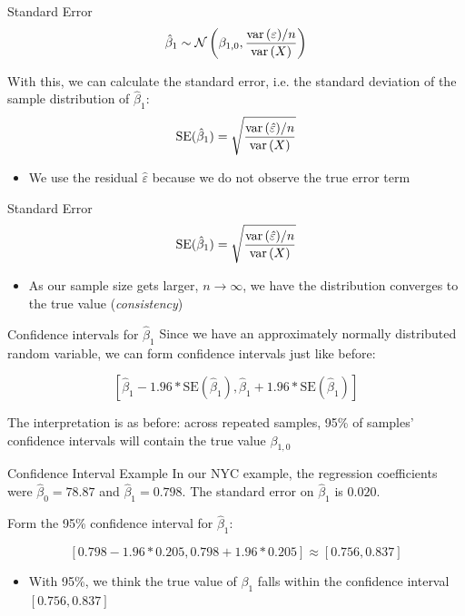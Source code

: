 \documentclass[aspectratio=169,t,11pt,table]{beamer}
\begin{document}
\begin{frame}{Standard Error}
  $$
    \hat{\beta}_1 \sim 
    \mathcal{N}\left( 
      \beta_{1, 0}, \frac{ \var{\varepsilon} / n }{\var{X}} 
    \right)
  $$

  \bigskip
  With this, we can calculate the \alert{standard error}, i.e. the standard deviation of the sample distribution of $\hat{\beta}_1$:
  $$
    \text{SE}(\hat{\beta}_1) = \sqrt{ \frac{ \var{\hat{\varepsilon}} / n }{\var{X}} }
  $$
  \begin{itemize}
    \item We use the residual $\hat{\varepsilon}$ because we do not observe the true error term
  \end{itemize}
\end{frame}

\begin{frame}{Standard Error}
  $$
    \text{SE}(\hat{\beta}_1) = \sqrt{ \frac{ \var{\hat{\varepsilon}} / n }{\var{X}} }
  $$

  \begin{itemize}
    \item As our sample size gets larger, $n \to \infty$, we have the distribution converges to the true value (\emph{consistency})
  \end{itemize}
\end{frame}


\begin{frame}{Confidence intervals for $\hat{\beta}_1$}
  Since we have an approximately normally distributed random variable, we can form confidence intervals just like before:

  $$
    \left[
      \hat{\beta}_1 - 1.96 * \text{SE}(\hat{\beta}_1), 
      \hat{\beta}_1 + 1.96 * \text{SE}(\hat{\beta}_1)
    \right]
  $$

  \pause
  \bigskip
  The interpretation is as before: across repeated samples, 95\% of samples' confidence intervals will contain the true value $\beta_{1, 0}$
\end{frame}

\begin{frame}{Confidence Interval Example}
  In our NYC example, the regression coefficients were $\hat{\beta}_0 = 78.87$ and $\hat{\beta}_1 = 0.798$. The standard error on $\hat{\beta}_1$ is $0.020$.

  \bigskip
  Form the 95\% confidence interval for $\hat{\beta}_1$:

  \pause
  $$
    \left[ 0.798 - 1.96 * 0.205, 0.798 + 1.96 * 0.205 \right] \approx
    \left[ 0.756, 0.837 \right]
  $$
  \begin{itemize}
    \item With 95\%, we think the true value of $\beta_1$ falls within the confidence interval $\left[ 0.756, 0.837 \right]$
  \end{itemize}
\end{frame}
\end{document}

